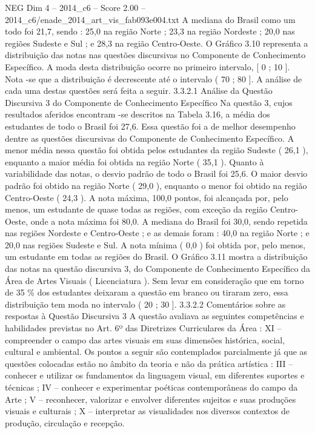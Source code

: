 \begin{textsample}{NEG Dim 4 – 2014\_c6 – Score 2.00 – 2014\_c6/enade\_2014\_art\_vis\_fab093e004.txt}
A mediana do Brasil como um todo foi 21,7, sendo : 25,0 na região Norte ; 23,3 na região Nordeste ; 20,0 nas regiões Sudeste e Sul ; e 28,3 na região Centro-Oeste.
O Gráfico 3.10 representa a distribuição das notas nas questões discursivas no Componente de Conhecimento Específico.
A moda desta distribuição ocorre no primeiro intervalo, [ 0 ; 10 ].
Nota -se que a distribuição é decrescente até o intervalo ( 70 ; 80 ].
A análise de cada uma destas questões será feita a seguir. 3.3.2.1 Análise da Questão Discursiva 3 do Componente de Conhecimento Específico Na questão 3, cujos resultados aferidos encontram -se descritos na Tabela 3.16, a média dos estudantes de todo o Brasil foi 27,6.
Essa questão foi a de melhor desempenho dentre as questões discursivas do Componente de Conhecimento Específico.
A menor média nessa questão foi obtida pelos estudantes da região Sudeste ( 26,1 ), enquanto a maior média foi obtida na região Norte ( 35,1 ).
Quanto à variabilidade das notas, o desvio padrão de todo o Brasil foi 25,6.
O maior desvio padrão foi obtido na região Norte ( 29,0 ), enquanto o menor foi obtido na região Centro-Oeste ( 24,3 ).
A nota máxima, 100,0 pontos, foi alcançada por, pelo menos, um estudante de quase todas as regiões, com exceção da região Centro-Oeste, onde a nota máxima foi 80,0.
A mediana do Brasil foi 30,0, sendo repetida nas regiões Nordeste e Centro-Oeste ; e as demais foram : 40,0 na região Norte ; e 20,0 nas regiões Sudeste e Sul.
A nota mínima ( 0,0 ) foi obtida por, pelo menos, um estudante em todas as regiões do Brasil.
O Gráfico 3.11 mostra a distribuição das notas na questão discursiva 3, do Componente de Conhecimento Específico da Área de Artes Visuais ( Licenciatura ).
Sem levar em consideração que em torno de 35 \% dos estudantes deixaram a questão em branco ou tiraram zero, essa distribuição tem moda no intervalo ( 20 ; 30 ]. 3.3.2.2 Comentários sobre as respostas à Questão Discursiva 3 A questão avaliava as seguintes competências e habilidades previstas no Art. 6º das Diretrizes Curriculares da Área : XI – compreender o campo das artes visuais em suas dimensões histórica, social, cultural e ambiental.
Os pontos a seguir são contemplados parcialmente já que as questões colocadas estão no âmbito da teoria e não da prática artística : III – conhecer e utilizar os fundamentos da linguagem visual, em diferentes suportes e técnicas ; IV – conhecer e experimentar poéticas contemporâneas do campo da Arte ; V – reconhecer, valorizar e envolver diferentes sujeitos e suas produções visuais e culturais ; X – interpretar as visualidades nos diversos contextos de produção, circulação e recepção.

\end{textsample}
